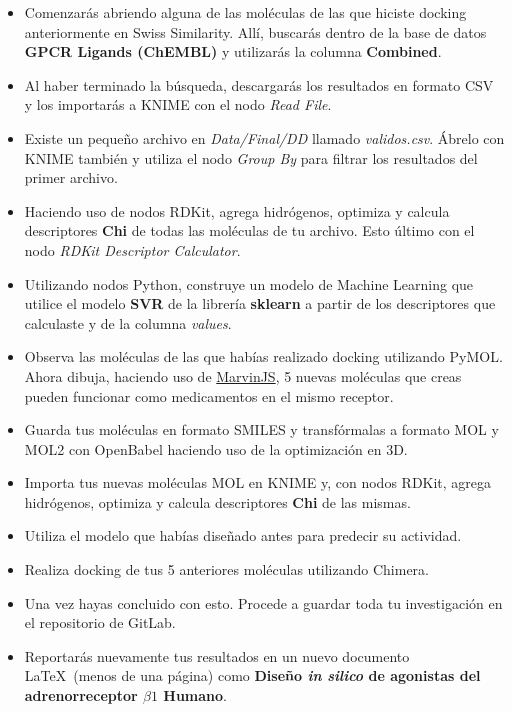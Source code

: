 \documentclass[10pt,letterpaper]{article}
\begin{document}
\begin{itemize}
\item Comenzar\'as abriendo alguna de las mol\'eculas de las que hiciste docking anteriormente en Swiss Similarity. All\'i, buscar\'as dentro de la base de datos \textbf{GPCR Ligands (ChEMBL)} y utilizar\'as la columna \textbf{Combined}.
\item Al haber terminado la b\'usqueda, descargar\'as los resultados en formato CSV y los importar\'as a KNIME con el nodo \textit{Read File}.
\item Existe un peque\~no archivo en \textit{Data/Final/DD} llamado \textit{validos.csv}. \'Abrelo con KNIME tambi\'en y utiliza el nodo \textit{Group By} para filtrar los resultados del primer archivo.
\item Haciendo uso de nodos RDKit, agrega hidr\'ogenos, optimiza y calcula descriptores \textbf{Chi} de todas las mol\'eculas de tu archivo. Esto \'ultimo con el nodo \textit{RDKit Descriptor Calculator}.
\item Utilizando nodos Python, construye un modelo de Machine Learning que utilice el modelo \textbf{SVR} de la librer\'ia \textbf{sklearn} a partir de los descriptores que calculaste y de la columna \textit{values}.
\item Observa las mol\'eculas de las que hab\'ias realizado docking utilizando PyMOL. Ahora dibuja, haciendo uso de \href{https://marvinjs-demo.chemaxon.com/latest/demo.html}{MarvinJS}, 5 nuevas mol\'eculas que creas pueden funcionar como medicamentos en el mismo receptor.
\item Guarda tus mol\'eculas en formato SMILES y transf\'ormalas a formato MOL y MOL2 con OpenBabel haciendo uso de la optimizaci\'on en 3D.
\item Importa tus nuevas mol\'eculas MOL en KNIME y, con nodos RDKit, agrega hidr\'ogenos, optimiza y calcula descriptores \textbf{Chi} de las mismas.
\item Utiliza el modelo que hab\'ias dise\~nado antes para predecir su actividad.
\item Realiza docking de tus 5 anteriores mol\'eculas utilizando Chimera.
\item Una vez hayas concluido con esto. Procede a guardar toda tu investigaci\'on en el repositorio de GitLab.
\item Reportar\'as nuevamente tus resultados en un nuevo documento \LaTeX\ (menos de una p\'agina) como \textbf{Dise\~no \emph{in silico} de agonistas del adrenorreceptor $\beta 1$ Humano}.
\end{itemize}
\end{document}
